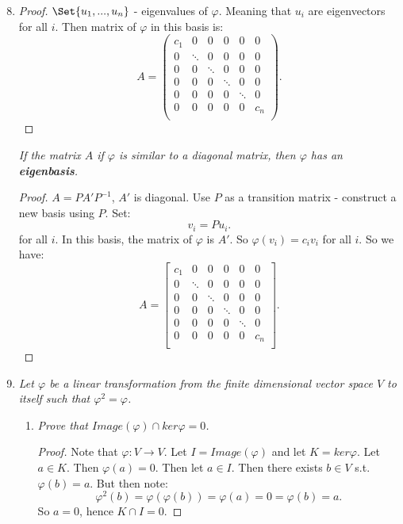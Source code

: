 \documentclass[9pt,reqno,twoside]{amsbook}
\theoremstyle{plain}
\numberwithin{section}{chapter}
\numberwithin{equation}{chapter}
\theoremstyle{definition}
\theoremstyle{remark}
\theoremstyle{plain}
\newcommand{\lpar}{\left(}
\newcommand{\rpar}{\right)}
\renewcommand{\phi}{\varphi}
\begin{document}
\begin{enumerate}[label=\arabic*.]
\setcounter{enumi}{7}

\item 

\begin{proof}
$\Set{u_1,...,u_n}$ - eigenvalues of $\phi$. Meaning that $u_i$ are eigenvectors for all $i$. Then matrix of $\phi$ in this basis is:
$$
A = \lpar 
\begin{matrix}
c_1 & 0 & 0 & 0 & 0 & 0\\
0 & \ddots & 0 & 0 & 0 & 0\\
0 & 0 & \ddots & 0 & 0 & 0\\
0 & 0 & 0 & \ddots & 0 & 0\\
0 & 0 & 0 & 0 & \ddots & 0\\
0 & 0 & 0 & 0 & 0 & c_n\\
\end{matrix} \rpar .
$$
\end{proof}


\textit{If the matrix $A$ if $\phi$ is similar to a diagonal matrix, then $\phi$ has an \textbf{eigenbasis}. }

\begin{proof}
$A = PA'P^{-1}$, $A'$ is diagonal. Use $P$ as a transition matrix - construct a new basis using $P$. Set:
$$
v_i = Pu_i.
$$
for all $i$. In this basis, the matrix of $\phi$ is $A'$. So $\phi(v_i) = c_iv_i$ for all $i$. So we have: 
$$
A = \left[ 
\begin{matrix}
c_1 & 0 & 0 & 0 & 0 & 0\\
0 & \ddots & 0 & 0 & 0 & 0\\
0 & 0 & \ddots & 0 & 0 & 0\\
0 & 0 & 0 & \ddots & 0 & 0\\
0 & 0 & 0 & 0 & \ddots & 0\\
0 & 0 & 0 & 0 & 0 & c_n\\
\end{matrix} \right] . 
$$
\end{proof}


\setcounter{enumi}{10}

\item \textit{Let $\phi$ be a linear transformation from the finite dimensional vector space $V$ to itself such that $\phi^2 = \phi$. }

\begin{enumerate}
\item \textit{Prove that $Image(\phi) \cap ker\phi = 0$. }

\begin{proof}
Note that $\phi:V \to V$. Let $I = Image(\phi)$ and let $K = ker\phi$. Let $a \in K$. Then $\phi(a) = 0$. Then let $a \in I$. Then there exists $b \in V$ s.t. $\phi(b) = a$. But then note:
$$
\phi^2(b) = \phi(\phi(b)) = \phi(a) = 0 = \phi(b) = a.
$$
So $a = 0$, hence $K \cap I = 0$. 
\end{proof}


\end{enumerate}
\end{enumerate}
\end{document}
